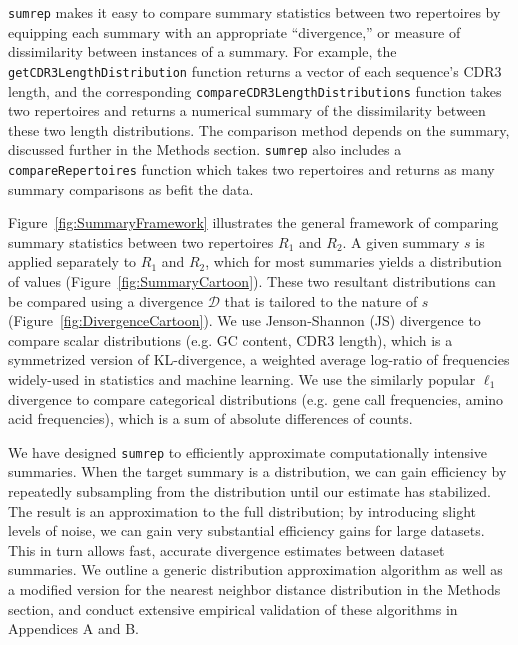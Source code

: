 \documentclass{article}
\begin{document}
\texttt{sumrep} makes it easy to compare summary statistics between two repertoires by equipping each summary with an appropriate ``divergence,'' or measure of dissimilarity between instances of a summary.
For example, the \texttt{getCDR3LengthDistribution} function returns a vector of each sequence's CDR3 length, and the corresponding \texttt{compareCDR3LengthDistributions} function takes two repertoires and returns a numerical summary of the dissimilarity between these two length distributions.
The comparison method depends on the summary, discussed further in the Methods section.
\texttt{sumrep} also includes a \texttt{compareRepertoires} function which takes two repertoires and returns as many summary comparisons as befit the data.

Figure~\ref{fig:SummaryFramework} illustrates the general framework of comparing summary statistics between two repertoires $R_1$ and $R_2$.
A given summary $s$ is applied separately to $R_1$ and $R_2$, which for most summaries yields a distribution of values (Figure~\ref{fig:SummaryCartoon}).
These two resultant distributions can be compared using a divergence $\mathcal D$ that is tailored to the nature of $s$ (Figure~\ref{fig:DivergenceCartoon}).
We use Jenson-Shannon (JS) divergence to compare scalar distributions (e.g. GC content, CDR3 length), which is a symmetrized version of KL-divergence, a weighted average log-ratio of frequencies widely-used in statistics and machine learning.
We use the similarly popular $\ell_1$ divergence to compare categorical distributions (e.g. gene call frequencies, amino acid frequencies), which is a sum of absolute differences of counts.

We have designed \texttt{sumrep} to efficiently approximate computationally intensive summaries.
When the target summary is a distribution, we can gain efficiency by repeatedly subsampling from the distribution until our estimate has stabilized.
The result is an approximation to the full distribution; by introducing slight levels of noise, we can gain very substantial efficiency gains for large datasets.
This in turn allows fast, accurate divergence estimates between dataset summaries.
We outline a generic distribution approximation algorithm as well as a modified version for the nearest neighbor distance distribution in the Methods section, and conduct extensive empirical validation of these algorithms in Appendices A and B.
\end{document}
